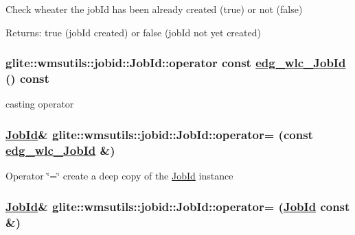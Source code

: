 Check wheater the job\-Id has been already created (true) or not (false) \begin{Desc}
\item[Returns:]true (job\-Id created) or false (job\-Id not yet created) \end{Desc}
\hypertarget{classglite_1_1wmsutils_1_1jobid_1_1JobId_a2}{
\subsubsection[operator const edg\_\-wlc\_\-JobId]{\setlength{\rightskip}{0pt plus 5cm}glite::wmsutils::jobid::Job\-Id::operator const \hyperlink{cjobid_8h_a2}{edg\_\-wlc\_\-Job\-Id} () const}}
\label{classglite_1_1wmsutils_1_1jobid_1_1JobId_a2}


casting operator \hypertarget{classglite_1_1wmsutils_1_1jobid_1_1JobId_a4}{
\subsubsection[operator=]{\setlength{\rightskip}{0pt plus 5cm}\hyperlink{classglite_1_1wmsutils_1_1jobid_1_1JobId}{Job\-Id}\& glite::wmsutils::jobid::Job\-Id::operator= (const \hyperlink{cjobid_8h_a2}{edg\_\-wlc\_\-Job\-Id} \&)}}
\label{classglite_1_1wmsutils_1_1jobid_1_1JobId_a4}


Operator \char`\"{}=\char`\"{} create a deep copy of the \hyperlink{classglite_1_1wmsutils_1_1jobid_1_1JobId}{Job\-Id} instance \hypertarget{classglite_1_1wmsutils_1_1jobid_1_1JobId_a3}{
\subsubsection[operator=]{\setlength{\rightskip}{0pt plus 5cm}\hyperlink{classglite_1_1wmsutils_1_1jobid_1_1JobId}{Job\-Id}\& glite::wmsutils::jobid::Job\-Id::operator= (\hyperlink{classglite_1_1wmsutils_1_1jobid_1_1JobId}{Job\-Id} const \&)}}
\label{classglite_1_1wmsutils_1_1jobid_1_1JobId_a3}


